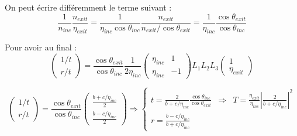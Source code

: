 \documentclass[a4paper,english]{article}
\begin{document}
On peut écrire différemment le terme suivant :
\begin{dmath}
\frac{1}{n_{inc}} \frac{n_{exit}}{\eta_{exit}} = \frac{1}{\eta_{inc} \cos \theta_{inc}} \frac{n_{exit}}{n_{exit} / \cos \theta_{exit}}
= \frac{1}{\eta_{inc}} \frac{\cos \theta_{exit}}{\cos \theta_{inc}}
\end{dmath}

Pour avoir au final :
\begin{dmath}
\begin{pmatrix}1/t \\ r/t \end{pmatrix} = \frac{\cos \theta_{exit}}{\cos \theta_{inc}} \frac{1}{2 \eta_{inc}} \begin{pmatrix} \eta_{inc} & 1 \\ \eta_{inc} & -1 \end{pmatrix} L_1 L_2 L_3 \begin{pmatrix} 1 \\ \eta_{exit} \end{pmatrix}
\end{dmath}

\begin{dmath}
\begin{pmatrix}1/t \\ r/t \end{pmatrix} =  \frac{\cos \theta_{exit}}{\cos \theta_{inc}} \begin{pmatrix} \frac{b + c / \eta_{inc}}{2} \\ \frac{b - c / \eta_{inc}}{2} \end{pmatrix} \Rightarrow
\left\{ \begin{array}{lll}
	t = \frac{2}{b + c / \eta_{inc}} \frac{\cos \theta_{inc}}{\cos \theta_{exit}}  &\Rightarrow & T = \frac{\eta_{exit}}{\eta_{inc}} \left| \frac{2}{b + c / \eta_{inc}} \right|^2\\
	r = \frac{b - c / \eta_{inc}}{b + c / \eta_{inc}}
\end{array} \right.
\end{dmath}
\end{document}
